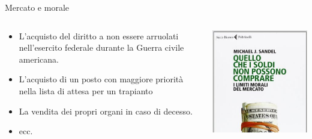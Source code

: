 \documentclass[aspectratio=64,11pt]{beamer}
\begin{document}
\begin{frame}{Mercato e morale}
\begin{columns}
\begin{column}{.6\columnwidth}
\begin{itemize}
\item L'acquisto del diritto a non essere arruolati nell’esercito federale durante
la Guerra civile americana.
\item L'acquisto di un posto con maggiore priorità nella lista di attesa per un
trapianto
\item La vendita dei propri organi in caso di decesso.
\item ecc.
\end{itemize}
\end{column}

\begin{column}{.4\columnwidth}
\begin{center}
\includegraphics[width=\textwidth]{./figure/Sandel-limiti-morali.jpeg}
\end{center}
\end{column}
\end{columns}
\end{frame}
\end{document}
